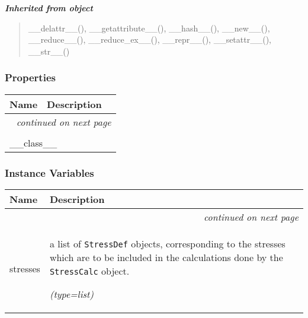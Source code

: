 \large{\textbf{\textit{Inherited from object}}}

\begin{quote}
\_\_delattr\_\_(), \_\_getattribute\_\_(), \_\_hash\_\_(), \_\_new\_\_(), \_\_reduce\_\_(), \_\_reduce\_ex\_\_(), \_\_repr\_\_(), \_\_setattr\_\_(), \_\_str\_\_()
\end{quote}


  \subsubsection{Properties}

    \vspace{-1cm}
\hspace{\varindent}\begin{longtable}{|p{\varnamewidth}|p{\vardescrwidth}|l}
\cline{1-2}
\cline{1-2} \centering \textbf{Name} & \centering \textbf{Description}& \\
\cline{1-2}
\endhead\cline{1-2}\multicolumn{3}{r}{\small\textit{continued on next page}}\\\endfoot\cline{1-2}
\endlastfoot\multicolumn{2}{|l|}{\textit{Inherited from object}}\\
\multicolumn{2}{|p{\varwidth}|}{\raggedright \_\_class\_\_}\\
\cline{1-2}
\end{longtable}



  \subsubsection{Instance Variables}

    \vspace{-1cm}
\hspace{\varindent}\begin{longtable}{|p{\varnamewidth}|p{\vardescrwidth}|l}
\cline{1-2}
\cline{1-2} \centering \textbf{Name} & \centering \textbf{Description}& \\
\cline{1-2}
\endhead\cline{1-2}\multicolumn{3}{r}{\small\textit{continued on next page}}\\\endfoot\cline{1-2}
\endlastfoot\raggedright s\-t\-r\-e\-s\-s\-e\-s\- & \raggedright a list of \texttt{StressDef} objects, corresponding to the 
          stresses which are to be included in the calculations done by the
          \texttt{StressCalc} object.

            {\it (type=list)}&\\
\cline{1-2}
\end{longtable}

